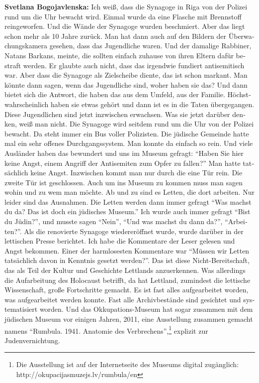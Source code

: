 \begin{otherlanguage}{ngerman}
\textbf{Svetlana Bogojavlenska:} Ich weiß, dass die Synagoge in Riga von der Polizei rund um die Uhr bewacht wird. Einmal wurde da eine Flasche mit Brennstoff reingeworfen. Und die Wände der Synagoge wurden beschmiert. Aber das liegt schon mehr als 10 Jahre zurück. Man hat dann auch auf den Bildern der Überwachungskamera gesehen, dass das Jugendliche waren. Und der damalige Rabbiner, Natans Barkans, meinte, die sollten einfach zuhause von ihren Eltern dafür bestraft werden. Er glaubte auch nicht, dass das irgendwie fundiert antisemitisch war. Aber dass die Synagoge als Zielscheibe diente, das ist schon markant. Man könnte dann sagen, wenn das Jugendliche sind, woher haben sie das? Und dann bietet sich die Antwort, die haben das aus dem Umfeld, aus der Familie. Höchstwahrscheinlich haben sie etwas gehört und dann ist es in die Taten übergegangen. Diese Jugendlichen sind jetzt inzwischen erwachsen. Was sie jetzt darüber denken, weiß man nicht. Die Synagoge wird seitdem rund um die Uhr von der Polizei bewacht. Da steht immer ein Bus voller Polizisten. Die jüdische Gemeinde hatte mal ein sehr offenes Durchgangssystem. Man konnte da einfach so rein. Und viele Ausländer haben das bewundert und uns im Museum gefragt: "`Haben Sie hier keine Angst, einem Angriff der Antisemiten zum Opfer zu fallen?"' Man hatte tatsächlich keine Angst. Inzwischen kommt man nur durch die eine Tür rein. Die zweite Tür ist geschlossen. Auch um ins Museum zu kommen muss man sagen wohin und zu wem man möchte.
Ab und zu sind es Letten, die dort arbeiten. Nur leider sind das Ausnahmen. Die Letten werden dann immer gefragt "`Was machst du da? Das ist doch ein jüdisches Museum."' Ich wurde auch immer gefragt "`Bist du Jüdin?"', und musste sagen "`Nein"', "`Und was machst du dann da?"', "`Arbeiten?"'. Als die renovierte Synagoge wiedereröffnet wurde, wurde darüber in der lettischen Presse berichtet. Ich habe die Kommentare der Leser gelesen und Angst bekommen. Einer der harmlosesten Kommentare war "`Müssen wir Letten tatsächlich davon in Kenntnis gesetzt werden?"'. Das ist diese Nicht-Bereitschaft, das als Teil der Kultur und Geschichte Lettlands anzuerkennen.
Was allerdings die Aufarbeitung des Holocaust betrifft, da hat Lettland, zumindest die lettische Wissenschaft, große Fortschritte gemacht. Es ist fast alles aufgearbeitet worden, was aufgearbeitet werden konnte. Fast alle Archivbestände sind gesichtet und systematisiert worden. Und das Okkupations-Museum hat sogar zusammen mit dem jüdischen Museum vor einigen Jahren, 2011, eine Ausstellung zusammen gemacht namens "`Rumbula. 1941. Anatomie des Verbrechens"',\footnote{Die Ausstellung ist auf der Internetseite des Museums digital zugänglich: http://okupacijasmuzejs.lv/rumbula/en} explizit zur Judenvernichtung.


\end{otherlanguage}

